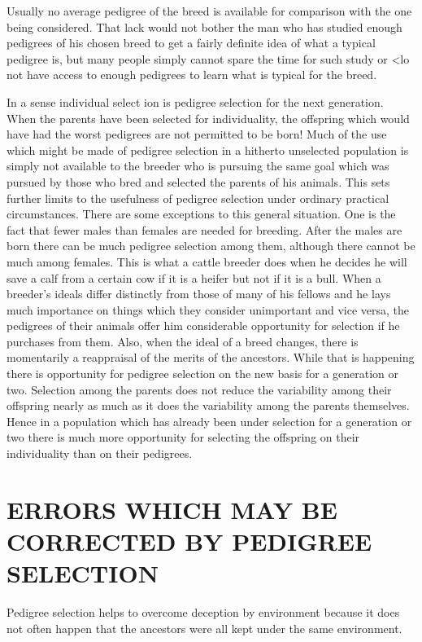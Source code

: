 Usually no average pedigree of the breed is available for comparison
with the one being considered. That lack would not bother the man
who has studied enough pedigrees of his chosen breed to get a fairly
definite idea of what a typical pedigree is, but many people simply cannot
spare the time for such study or <lo not have access to enough pedigrees
to learn what is typical for the breed.
\noclub

In a sense individual select ion is pedigree selection for the next
generation. When the parents have been selected for individuality, the
offspring which would have had the worst pedigrees are not permitted
to be born! Much of the use which might be made of pedigree selection
in a hitherto unselected population is simply not available to the breeder
who is pursuing the same goal which was pursued by those who bred
and selected the parents of his animals. This sets further limits to the
usefulness of pedigree selection under ordinary practical circumstances.
There are some exceptions to this general situation. One is the fact that
fewer males than females are needed for breeding. After the males are
born there can be much pedigree selection among them, although there
cannot be much among females. This is what a cattle breeder does when
he decides he will save a calf from a certain cow if it is a heifer but not if
it is a bull. When a breeder's ideals differ distinctly from those of many
of his fellows and he lays much importance on things which they consider
unimportant and vice versa, the pedigrees of their animals offer
him considerable opportunity for selection if he purchases from them.
Also, when the ideal of a breed changes, there is momentarily a reappraisal
of the merits of the ancestors. While that is happening there is
opportunity for pedigree selection on the new basis for a generation or
two. Selection among the parents does not reduce the variability among
their offspring nearly as much as it does the variability among the parents
themselves. Hence in a population which has already been under
selection for a generation or two there is much more opportunity for
selecting the offspring on their individuality than on their pedigrees.

\section*{ERRORS WHICH MAY BE CORRECTED BY PEDIGREE SELECTION}

Pedigree selection helps to overcome deception by environment
because it does not often happen that the ancestors were all kept under
the same environment.

